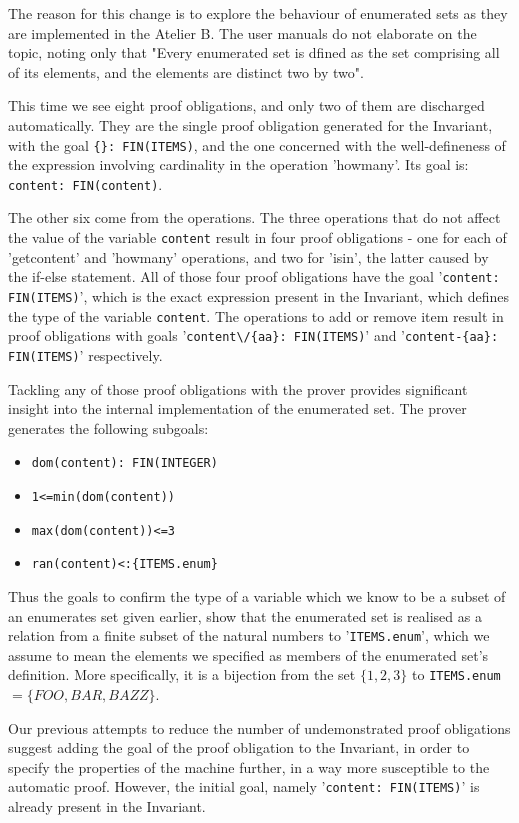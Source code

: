 \documentclass[12pt,journal,duplex]{IEEEtran}
\begin{document}
	The reason for this change is to explore the behaviour of enumerated sets as they are implemented in the Atelier B. The user manuals do not elaborate on the topic, noting only that "Every enumerated set is dfined as the set comprising all of its elements, and the
	elements are distinct two by two"\cite{PO reference}.

	This time we see eight proof obligations, and only two of them are discharged automatically. They are the single proof obligation generated for the Invariant, with the goal \texttt{\{\}: FIN(ITEMS)}, and the one concerned with the well-defineness of the expression involving cardinality in the operation 'howmany'. Its goal is: \texttt{content: FIN(content)}.

	The other six come from the operations. The three operations that do not affect the value of the variable \texttt{content} result in four proof obligations - one for each of 'getcontent' and 'howmany' operations, and two for 'isin', the latter caused by the if-else statement. All of those four proof obligations have the goal '\texttt{content: FIN(ITEMS)}', which is the exact expression present in the Invariant, which defines the type of the variable \texttt{content}. The operations to add or remove item result in proof obligations with goals '\verb|content\/{aa}: FIN(ITEMS)|' and '\verb|content-{aa}: FIN(ITEMS)|' respectively.

	Tackling any of those proof obligations with the prover provides significant insight into the internal implementation of the enumerated set. The prover generates the following subgoals:

	\begin{itemize}
		\item \verb|dom(content): FIN(INTEGER)|
		\item \verb|1<=min(dom(content))|
		\item \verb|max(dom(content))<=3|
		\item \verb|ran(content)<:{ITEMS.enum}|
	\end{itemize}
	Thus the goals to confirm the type of a variable which we know to be a subset of an enumerates set given earlier, show that the enumerated set is realised as a relation from a finite subset of the natural numbers to '\texttt{ITEMS.enum}', which we assume to mean the elements we specified as members of the enumerated set's definition. More specifically, it is a bijection from the set $\{1,2,3\}$ to \texttt{ITEMS.enum} $= \{FOO, BAR, BAZZ\}$.

	Our previous attempts to reduce the number of undemonstrated proof obligations suggest adding the goal of the proof obligation to the Invariant, in order to specify the properties of the machine further, in a way more susceptible to the automatic proof. However, the initial goal, namely '\texttt{content: FIN(ITEMS)}' is already present in the Invariant.
\end{document}
